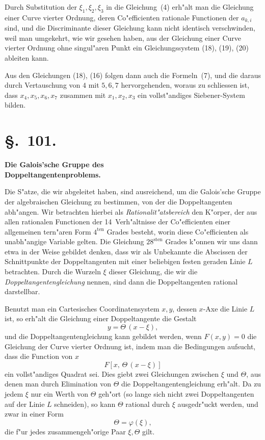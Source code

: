 \documentclass[12pt,a4paper]{article}
\theoremstyle{plain}
\begin{document}
Durch Substitution der $\xi_1, \xi_2, \xi_3$ in die Gleichung~(4) erh"alt man die Gleichung einer Curve vierter Ordnung, deren Co"efficienten rationale Functionen der $a_{k,i}$ sind, und die Discriminante dieser Gleichung kann nicht identisch verschwinden, weil man umgekehrt, wie wir gesehen haben, aus der Gleichung einer Curve vierter Ordnung ohne singul"aren Punkt ein Gleichungssystem (18), (19), (20) ableiten kann.

Aus den Gleichungen (18), (16) folgen dann auch die Formeln~(7), und die daraus durch Vertauschung von $4$ mit $5, 6, 7$ hervorgehenden, woraus zu schliessen ist, dass $x_4, x_5, x_6, x_7$ zusammen mit $x_1, x_2, x_3$ ein vollst"andiges Siebener-System bilden.

\section*{\S.~101.}
\begin{center}
\large\bfseries Die Galois'sche Gruppe des\\ Doppeltangentenproblems.
\end{center}
\vspace{0.5em}

Die S"atze, die wir abgeleitet haben, sind ausreichend, um die Galois'sche Gruppe der algebraischen Gleichung zu bestimmen, von der die Doppeltangenten abh"angen. Wir betrachten hierbei als \emph{Rationalit"atsbereich} den K"orper, der aus allen rationalen Functionen der 14~Verh"altnisse der Co"efficienten einer allgemeinen tern"aren Form $4^{\text{ten}}$ Grades besteht, worin diese Co"efficienten als unabh"angige Variable gelten. Die Gleichung $28^{\text{sten}}$ Grades k"onnen wir uns dann etwa in der Weise gebildet denken, dass wir als Unbekannte die Abscissen der Schnittpunkte der Doppeltangenten mit einer beliebigen festen geraden Linie $L$ betrachten. Durch die Wurzeln $\xi$ dieser Gleichung, die wir die \emph{Doppeltangentengleichung} nennen, sind dann die Doppeltangenten rational darstellbar.

Benutzt man ein Cartesisches Coordinatensystem $x, y$, dessen $x$-Axe die Linie $L$ ist, so erh"alt die Gleichung einer Doppeltangente die Gestalt
\begin{equation}\tag{1}
y = \Theta\,(x - \xi),
\end{equation}
und die Doppeltangentengleichung kann gebildet werden, wenn $F(x,y)=0$ die Gleichung der Curve vierter Ordnung ist, indem man die Bedingungen aufsucht, dass die Function von $x$
\[F[x,\,\Theta\,(x-\xi)]\]
ein vollst"andiges Quadrat sei. Dies giebt zwei Gleichungen zwischen $\xi$ und $\Theta$, aus denen man durch Elimination von $\Theta$ die Doppeltangentengleichung erh"alt. Da zu jedem $\xi$ nur ein Werth von $\Theta$ geh"ort (so lange sich nicht zwei Doppeltangenten auf der Linie $L$ schneiden), so kann $\Theta$ rational durch $\xi$ ausgedr"uckt werden, und zwar in einer Form
\begin{equation}\tag{2}
\Theta = \varphi(\xi),
\end{equation}
die f"ur jedes zusammengeh"orige Paar $\xi, \Theta$ gilt.
\end{document}
